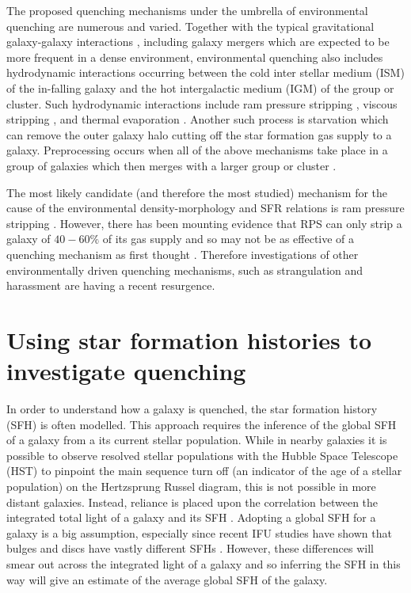 The proposed quenching mechanisms under the umbrella of environmental quenching are numerous and varied. Together with the typical gravitational galaxy-galaxy interactions \citep{moore96}, including galaxy mergers which are expected to be more frequent in a dense environment, environmental quenching also includes hydrodynamic interactions occurring between the cold inter stellar medium (ISM) of the in-falling galaxy and the hot intergalactic medium (IGM) of the group or cluster. Such hydrodynamic interactions include ram pressure stripping \citep{gunngott72}, viscous stripping \citep{nulsen82}, and thermal evaporation \citep[a rapid rise in temperature of the ISM due to contact with the IGM;][]{cowie77}. Another such process is starvation \citep{larson80} which can remove the outer galaxy halo cutting off the star formation gas supply to a galaxy. Preprocessing occurs when all of the above mechanisms take place in a group of galaxies which then merges with a larger group or cluster \citep{dressler04}. 

The most likely candidate (and therefore the most studied) mechanism for the cause of the environmental density-morphology and SFR relations is ram pressure stripping \citep[RPS;][]{abadi99, poggianti99}. However, there has been mounting evidence that RPS can only strip a galaxy of $40-60\%$ of its gas supply \citep{fillingham16} and so may not be as effective of a quenching mechanism as first thought \citep{emerick16}. Therefore investigations of other environmentally driven quenching mechanisms, such as strangulation \citep{peng15, hahn16, maier16, paccagnella16, roberts16, vandevoort16} and harassment \citep{bialas15, smith15b} are having a recent resurgence. 

\section{Using star formation histories to investigate quenching}\label{sec:invquench}


In order to understand how a galaxy is quenched, the star formation history (SFH) is often modelled. This approach requires the inference of the global SFH of a galaxy from a its current stellar population. While in nearby galaxies it is possible to observe resolved stellar populations with the Hubble Space Telescope (HST) to pinpoint the main sequence turn off (an indicator of the age of a stellar population) on the Hertzsprung Russel diagram, this is not possible in more distant galaxies. Instead, reliance is placed upon the correlation between the integrated total light of a galaxy and its SFH \citep{searle73}. Adopting a global SFH for a galaxy is a big assumption, especially since recent IFU studies have shown that bulges and discs have vastly different SFHs \citep[see for example][]{johnston16}. However, these differences will smear out across the integrated light of a galaxy and so inferring the SFH in this way will give an estimate of the average global SFH of the galaxy. 

